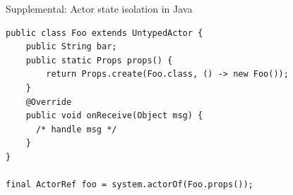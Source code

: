 \documentclass{beamer}
\begin{document}
\begin{frame}[fragile]{Supplemental: Actor state isolation in Java}

\begin{verbatim}
public class Foo extends UntypedActor {
    public String bar;
    public static Props props() {
        return Props.create(Foo.class, () -> new Foo());
    }
    @Override
    public void onReceive(Object msg) { 
      /* handle msg */ 
    }
}

final ActorRef foo = system.actorOf(Foo.props());
\end{verbatim}

\end{frame}

\end{document}
